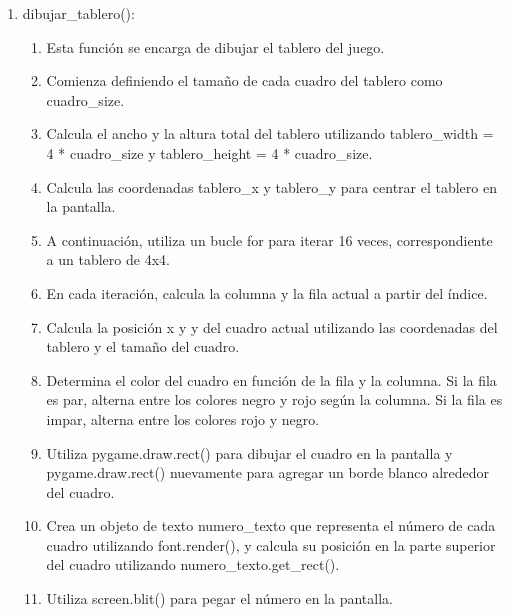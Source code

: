 \begin{enumerate}
\begin{enumerate}
    \item dibujar\_tablero():\newline
    \begin{enumerate}
        \item Esta función se encarga de dibujar el tablero del juego.\newline
        \item Comienza definiendo el tamaño de cada cuadro del tablero como cuadro\_size.\newline
        \item Calcula el ancho y la altura total del tablero utilizando tablero\_width = 4 * cuadro\_size y tablero\_height = 4 * cuadro\_size.\newline
        \item Calcula las coordenadas tablero\_x y tablero\_y para centrar el tablero en la pantalla.\newline
        \item A continuación, utiliza un bucle for para iterar 16 veces, correspondiente a un tablero de 4x4.\newline
        \item En cada iteración, calcula la columna y la fila actual a partir del índice.\newline
        \item Calcula la posición x y y del cuadro actual utilizando las coordenadas del tablero y el tamaño del cuadro.\newline
        \item Determina el color del cuadro en función de la fila y la columna. Si la fila es par, alterna entre los colores negro y rojo según la columna. Si la fila es impar, alterna entre los colores rojo y negro.\newline
        \item Utiliza pygame.draw.rect() para dibujar el cuadro en la pantalla y pygame.draw.rect() nuevamente para agregar un borde blanco alrededor del cuadro.\newline
        \item Crea un objeto de texto numero\_texto que representa el número de cada cuadro utilizando font.render(), y calcula su posición en la parte superior del cuadro utilizando numero_texto.get_rect().\newline
        \item Utiliza screen.blit() para pegar el número en la pantalla.\newline
    \end{enumerate}


\end{enumerate}
\end{enumerate}
